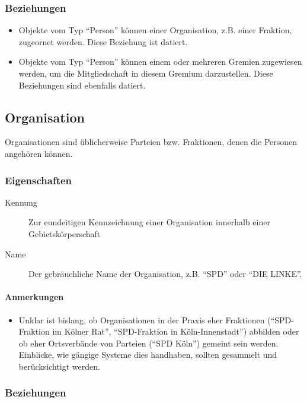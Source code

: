 \subsubsection{Beziehungen}

\begin{itemize}
\item
  Objekte vom Typ ``Person'' können einer Organisation, z.B. einer
  Fraktion, zugeornet werden. Diese Beziehung ist datiert.
\item
  Objekte vom Typ ``Person'' können einem oder mehreren Gremien
  zugewiesen werden, um die Mitgliedschaft in diesem Gremium
  darzustellen. Diese Beziehungen sind ebenfalls datiert.
\end{itemize}

\subsection{Organisation}

Organisationen sind üblicherweise Parteien bzw. Fraktionen, denen die
Personen angehören können.

\subsubsection{Eigenschaften}

\begin{description}
\item[Kennung]
Zur eundeitigen Kennzeichnung einer Organisation innerhalb einer
Gebietskörperschaft
\item[Name]
Der gebräuchliche Name der Organisation, z.B. ``SPD'' oder ``DIE
LINKE''.
\end{description}

\paragraph{Anmerkungen}

\begin{itemize}
\item
  Unklar ist bislang, ob Organisationen in der Praxis eher Fraktionen
  (``SPD-Fraktion im Kölner Rat'', ``SPD-Fraktion in Köln-Innenstadt'')
  abbilden oder ob eher Ortsverbände von Parteien (``SPD Köln'') gemeint
  sein werden. Einblicke, wie gängige Systeme dies handhaben, sollten
  gesammelt und berücksichtigt werden.
\end{itemize}

\subsubsection{Beziehungen}

